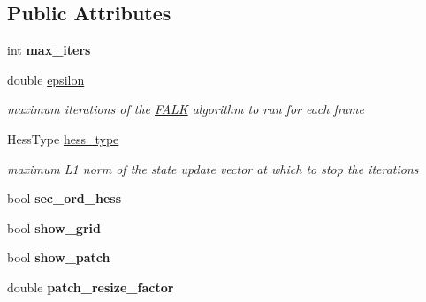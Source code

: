\subsection*{Public Attributes}
\begin{DoxyCompactItemize}
\item 
\hypertarget{structFALKParams_afb17dcf190ea13e6ceabd1e4feddfc4a}{int {\bfseries max\-\_\-iters}}\label{structFALKParams_afb17dcf190ea13e6ceabd1e4feddfc4a}

\item 
\hypertarget{structFALKParams_a83fc27e9249e2cad6a717d298b35dfaf}{double \hyperlink{structFALKParams_a83fc27e9249e2cad6a717d298b35dfaf}{epsilon}}\label{structFALKParams_a83fc27e9249e2cad6a717d298b35dfaf}

\begin{DoxyCompactList}\small\item\em maximum iterations of the \hyperlink{classFALK}{F\-A\-L\-K} algorithm to run for each frame \end{DoxyCompactList}\item 
\hypertarget{structFALKParams_aa3fe6c35c22f76ecde01d92f94380c32}{Hess\-Type \hyperlink{structFALKParams_aa3fe6c35c22f76ecde01d92f94380c32}{hess\-\_\-type}}\label{structFALKParams_aa3fe6c35c22f76ecde01d92f94380c32}

\begin{DoxyCompactList}\small\item\em maximum L1 norm of the state update vector at which to stop the iterations \end{DoxyCompactList}\item 
\hypertarget{structFALKParams_a06525c0f52efb447003b9781af356912}{bool {\bfseries sec\-\_\-ord\-\_\-hess}}\label{structFALKParams_a06525c0f52efb447003b9781af356912}

\item 
\hypertarget{structFALKParams_a27e82e7de3bb6734a4577769aebb2e03}{bool {\bfseries show\-\_\-grid}}\label{structFALKParams_a27e82e7de3bb6734a4577769aebb2e03}

\item 
\hypertarget{structFALKParams_a22855504c3ca706015338c7fb7bbd22a}{bool {\bfseries show\-\_\-patch}}\label{structFALKParams_a22855504c3ca706015338c7fb7bbd22a}

\item 
\hypertarget{structFALKParams_a8c43fe1b56fef51b74cb547092b49537}{double {\bfseries patch\-\_\-resize\-\_\-factor}}\label{structFALKParams_a8c43fe1b56fef51b74cb547092b49537}


\end{DoxyCompactItemize}
